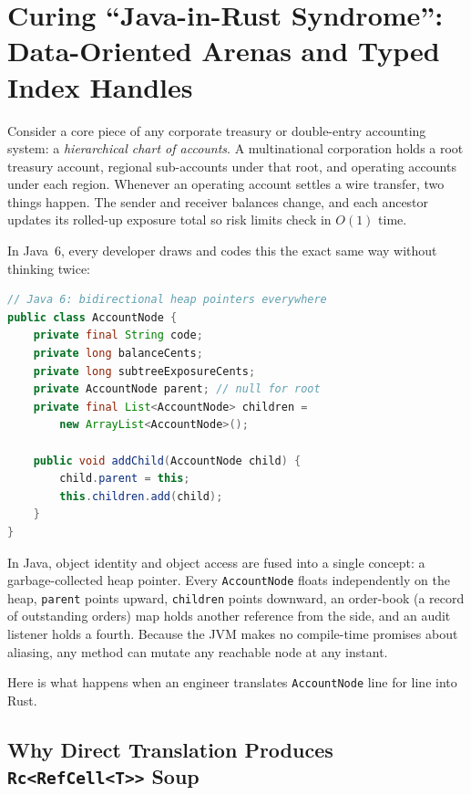 \chapterline

\section{Curing ``Java-in-Rust Syndrome'': Data-Oriented Arenas and Typed Index Handles}
\label{ch08:arenas-and-handles}

Consider a core piece of any corporate treasury or double-entry accounting system: a \emph{hierarchical chart of accounts}. A multinational corporation holds a root treasury account, regional sub-accounts under that root, and operating accounts under each region. Whenever an operating account settles a wire transfer, two things happen. The sender and receiver balances change, and each ancestor updates its rolled-up exposure total so risk limits check in $O(1)$ time.

In Java~6, every developer draws and codes this the exact same way without thinking twice:

\begin{lstlisting}[language=Java]
// Java 6: bidirectional heap pointers everywhere
public class AccountNode {
    private final String code;
    private long balanceCents;
    private long subtreeExposureCents;
    private AccountNode parent; // null for root
    private final List<AccountNode> children =
        new ArrayList<AccountNode>();

    public void addChild(AccountNode child) {
        child.parent = this;
        this.children.add(child);
    }
}
\end{lstlisting}

In Java, object identity and object access are fused into a single concept: a garbage-collected heap pointer. Every \texttt{AccountNode} floats independently on the heap, \texttt{parent} points upward, \texttt{children} points downward, an order-book (a record of outstanding orders) map holds another reference from the side, and an audit listener holds a fourth. Because the JVM makes no compile-time promises about aliasing, any method can mutate any reachable node at any instant.

Here is what happens when an engineer translates \texttt{AccountNode} line for line into Rust.

\subsection{Why Direct Translation Produces \texttt{Rc<RefCell<T>>} Soup}

